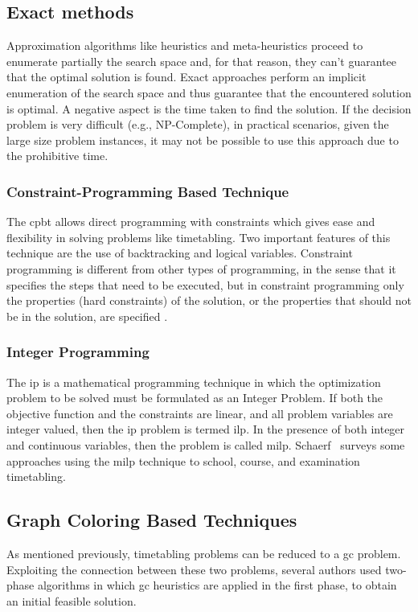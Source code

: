 \subsection{Exact methods}
\label{subsec:ExactMethods}
Approximation algorithms like heuristics and meta-heuristics proceed to enumerate partially the search space and, for that reason, they can't guarantee that the optimal solution is found. Exact approaches perform an implicit enumeration of the search space and thus guarantee that the encountered solution is optimal. A negative aspect is the time taken to find the solution. If the decision problem is very difficult (e.g., NP-Complete), in practical scenarios, given the large size problem instances, it may not be possible to use this approach due to the prohibitive time.\\

\subsubsection{Constraint-Programming Based Technique}
The \gls{cpbt} \cite{Boizumault1996} allows direct programming with constraints which gives ease and flexibility in solving problems like timetabling. Two important features of this technique are the use of backtracking and logical variables. Constraint programming is different from other types of programming, in the sense that it specifies the steps that need to be executed, but in constraint programming only the properties (hard constraints) of the solution, or the properties that should not be in the solution, are specified \cite{Qu2009}.\\

\subsubsection{Integer Programming}
The \gls{ip} \cite{Al-Yakoob2010} is a mathematical programming technique in which the optimization problem to be solved must be formulated as an Integer Problem. If both the objective function and the constraints are linear, and all problem variables are integer valued, then the \gls{ip} problem is termed \gls{ilp}. In the presence of both integer and continuous variables, then the problem is called \gls{milp}. Schaerf~\cite{Schaerf1999} surveys some approaches using the \gls{milp} technique to school, course, and examination timetabling.\\

\subsection{Graph Coloring Based Techniques}
\label{subsec:GraphColoring}
As mentioned previously, timetabling problems can be reduced to a \gls{gc} problem. Exploiting the connection between these two problems, several authors used two-phase algorithms in which \gls{gc} heuristics are applied in the first phase, to obtain an initial feasible solution.\\

